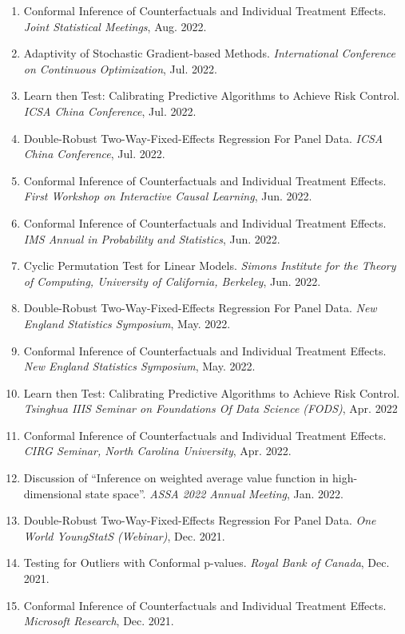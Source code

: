 \documentclass{article}
\begin{document}
\begin{enumerate}
\item Conformal Inference of Counterfactuals and Individual Treatment Effects. \emph{Joint Statistical Meetings}, Aug. 2022.
\item Adaptivity of Stochastic Gradient-based Methods. \emph{International Conference on Continuous Optimization}, Jul. 2022. 
\item Learn then Test: Calibrating Predictive Algorithms to Achieve Risk Control.  \emph{ICSA China Conference}, Jul. 2022.
\item Double-Robust Two-Way-Fixed-Effects Regression For Panel Data. \emph{ICSA China Conference}, Jul. 2022.
\item Conformal Inference of Counterfactuals and Individual Treatment Effects. \emph{First Workshop on Interactive Causal Learning}, Jun. 2022.
\item Conformal Inference of Counterfactuals and Individual Treatment Effects. \emph{IMS Annual in Probability and Statistics}, Jun. 2022.
\item Cyclic Permutation Test for Linear Models. \emph{Simons Institute for the Theory of Computing, University of California, Berkeley}, Jun. 2022.
\item Double-Robust Two-Way-Fixed-Effects Regression For Panel Data. \emph{New England Statistics Symposium}, May. 2022.
\item Conformal Inference of Counterfactuals and Individual Treatment Effects. \emph{New England Statistics Symposium}, May. 2022.
\item Learn then Test: Calibrating Predictive Algorithms to Achieve Risk Control. \emph{Tsinghua IIIS Seminar on Foundations Of Data Science (FODS)}, Apr. 2022
\item Conformal Inference of Counterfactuals and Individual Treatment Effects. \emph{CIRG Seminar, North Carolina University}, Apr. 2022.  
\item Discussion of ``Inference on weighted average value function in high-dimensional state space''. \emph{ASSA 2022 Annual Meeting}, Jan. 2022.
\item Double-Robust Two-Way-Fixed-Effects Regression For Panel Data. \emph{One World YoungStatS (Webinar)}, Dec. 2021.
\item Testing for Outliers with Conformal p-values. \emph{Royal Bank of Canada}, Dec. 2021.  
\item Conformal Inference of Counterfactuals and Individual Treatment Effects. \emph{Microsoft Research}, Dec. 2021.

\end{enumerate}
\end{document}
